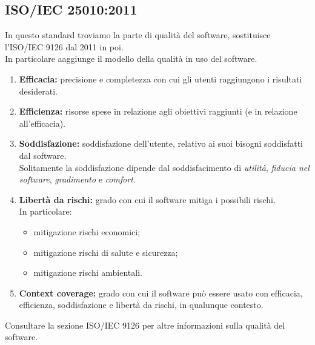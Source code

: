 \subsection{ISO/IEC 25010:2011}
In questo standard troviamo la parte di qualità del software, sostituisce l'ISO/IEC 9126 dal 2011 in poi.\\
In particolare aaggiunge il modello della qualità in uso del software.\\
\begin{enumerate}
	\item \textbf{Efficacia:} precisione e completezza con cui gli utenti raggiungono i risultati desiderati.
	\item \textbf{Efficienza:} risorse spese in relazione agli obiettivi raggiunti (e in relazione all'efficacia).
	\item \textbf{Soddisfazione:} soddisfazione dell'utente, relativo ai suoi bisogni soddisfatti dal software.\\Solitamente la soddisfazione dipende dal soddisfacimento di \textit{utilità}, \textit{fiducia nel software}, \textit{gradimento} e \textit{comfort}.
	\item \textbf{Libertà da rischi:} grado con cui il software mitiga i possibili rischi.\\In particolare:
		\begin{itemize}
			\item mitigazione rischi economici;
			\item mitigazione rischi di salute e sicurezza;
			\item mitigazione rischi ambientali.
		\end{itemize}
	\item \textbf{Context coverage:} grado con cui il software può essere usato con efficacia, efficienza, soddisfazione e libertà da rischi, in qualunque contesto.
\end{enumerate}
Consultare la sezione ISO/IEC 9126 per altre informazioni sulla qualità del software.
